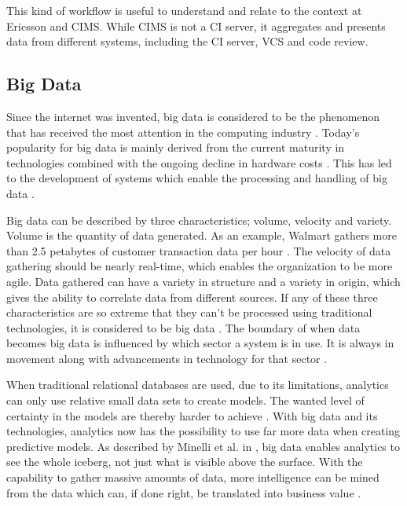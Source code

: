 This kind of workflow is useful to understand and relate to the context at Ericsson and CIMS. While CIMS is not a CI server, it aggregates and presents data from different systems, including the CI server, VCS and code review.


\subsection{Big Data}
Since the internet was invented, big data is considered to be the phenomenon that has received the most attention in the computing industry \cite{bigDataWarehouse}. Today's popularity for big data is mainly derived from the current maturity in technologies combined with the ongoing decline in hardware costs \cite{bigDataWarehouse, bigDatabigAn}. This has led to the development of systems which enable the processing and handling of big data \cite{bigDataWarehouse}.

Big data can be described by three characteristics; volume, velocity and variety. Volume is the quantity of data generated. As an example, Walmart gathers more than 2.5 petabytes of customer transaction data per hour \cite{bigDataMane}. The velocity of data gathering should be nearly real-time, which enables the organization to be more agile. Data gathered can have a variety in structure and a variety in origin, which gives the ability to correlate data from different sources. If any of these three characteristics are so extreme that they can't be processed using traditional technologies, it is considered to be big data \cite{bigDataWarehouse}. The boundary of when data becomes big data is influenced by which sector a system is in use. It is always in movement along with advancements in technology for that sector \cite{bigDatabigAn}. 

When traditional relational databases are used, due to its limitations, analytics can only use relative small data sets to create models. The wanted level of certainty in the models are thereby harder to achieve \cite{bigDatabigAn}. With big data and its technologies, analytics now has the possibility to use far more data when creating predictive models. As described by Minelli et al. in \cite{bigDatabigAn}, big data enables analytics to see the whole iceberg, not just what is visible above the surface. With the capability to gather massive amounts of data, more intelligence can be mined from the data which can, if done right, be translated into business value \cite{bigDataMane}.


